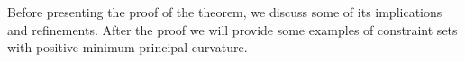 \documentclass[english]{article}
\begin{document}
%
%
%

Before presenting the proof of the theorem, we discuss some of its implications and refinements. After the proof we will provide some examples of constraint sets with positive minimum principal curvature.
\end{document}
